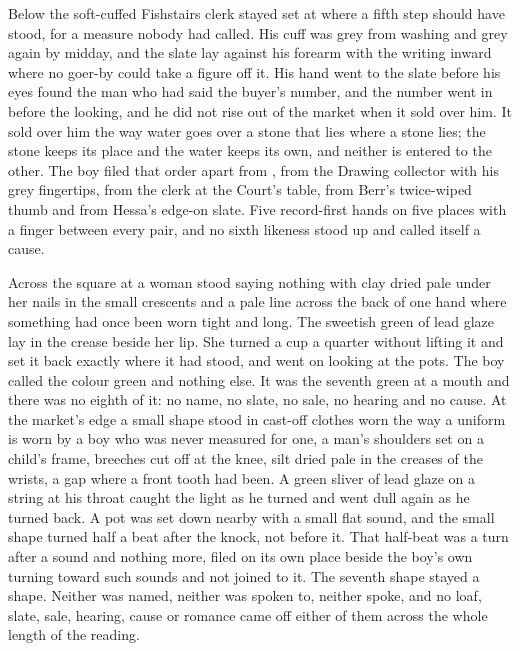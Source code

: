 Below  the soft-cuffed Fishstairs clerk stayed set at  where a fifth step should have stood, for a measure nobody had called. His cuff was grey from washing and grey again by midday, and the slate lay against his forearm with the writing inward where no goer-by could take a figure off it. His hand went to the slate before his eyes found the man who had said the buyer's number, and the number went in before the looking, and he did not rise out of the market when it sold over him. It sold over him the way water goes over a stone that lies where a stone lies; the stone keeps its place and the water keeps its own, and neither is entered to the other. The boy filed that order apart from , from the Drawing collector with his grey fingertips, from the clerk at the Court's table, from Berr's twice-wiped thumb and from Hessa's edge-on slate. Five record-first hands on five places with a finger between every pair, and no sixth likeness stood up and called itself a cause.

Across the square at  a woman stood saying nothing with clay dried pale under her nails in the small crescents and a pale line across the back of one hand where something had once been worn tight and long. The sweetish green of lead glaze lay in the crease beside her lip. She turned a cup a quarter without lifting it and set it back exactly where it had stood, and went on looking at the pots. The boy called the colour green and nothing else. It was the seventh green at a mouth and there was no eighth of it: no name, no slate, no sale, no hearing and no cause. At the market's edge a small shape stood in cast-off clothes worn the way a uniform is worn by a boy who was never measured for one, a man's shoulders set on a child's frame, breeches cut off at the knee, silt dried pale in the creases of the wrists, a gap where a front tooth had been. A green sliver of lead glaze on a string at his throat caught the light as he turned and went dull again as he turned back. A pot was set down nearby with a small flat sound, and the small shape turned half a beat after the knock, not before it. That half-beat was a turn after a sound and nothing more, filed on its own place beside the boy's own turning toward such sounds and not joined to it. The seventh shape stayed a shape. Neither was named, neither was spoken to, neither spoke, and no loaf, slate, sale, hearing, cause or romance came off either of them across the whole length of the reading.


